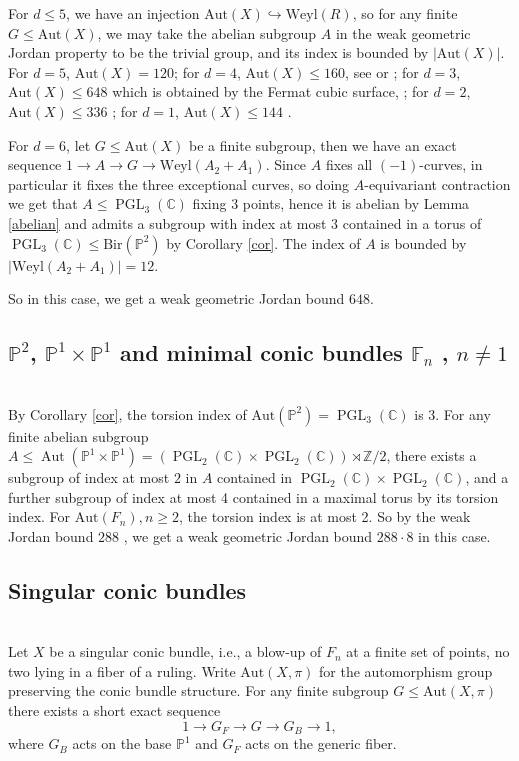 \documentclass[a4paper,12pt,oneside]{amsart}
\numberwithin{equation}{section}
\theoremstyle{definition}
\theoremstyle{remark}
\newcommand{\PP}{\mathbb{P}}
\newcommand{\Aut}{\mathrm{Aut}}
\begin{document}
For $d \leq 5$, we have an injection $\mathrm{Aut}(X) \hookrightarrow \mathrm{Weyl}(R)$, so for any finite $G\leqslant \mathrm{Aut}(X)$, we may take the abelian subgroup $A$ in the weak geometric Jordan property to be the trivial group, and its index is bounded by $|\mathrm{Aut}(X)|$. For $d=5$, $\mathrm{Aut}(X)=120$; for $d=4$, $\mathrm{Aut}(X)\leq 160$, see \cite[Theorem 1.1]{Hosoh1996} or \cite[Theorem 8.6.6]{Dolgachev2012}; for $d=3$, $\mathrm{Aut}(X)\leq 648$ which is obtained by the Fermat cubic surface, \cite[Theorem 9.5.6]{Dolgachev2012}; for $d=2$, $\mathrm{Aut}(X)\leq 336$ \cite[Section 8.7.3]{Dolgachev2012}; for $d=1$, $\mathrm{Aut}(X)\leq 144$ \cite[Section 8.8.4]{Dolgachev2012}.  

For $d = 6$, let $G\leqslant \Aut(X)$ be a finite subgroup, then we have an exact sequence $1 \to A \to G \to \mathrm{Weyl}(A_2 + A_1)$. Since $A$ fixes all $(-1)$-curves, in particular it fixes the three exceptional curves, so doing $A$-equivariant contraction we get that $A \leqslant \operatorname{PGL}_3(\mathbb{C})$ fixing $3$ points, hence it is abelian by Lemma \ref{abelian} and admits a subgroup with index at most $3$ contained in a torus of $\operatorname{PGL}_3(\mathbb{C}) \leqslant \mathrm{Bir}(\mathbb P^2)$ by Corollary \ref{cor}. The index of $A$ is bounded by $|\mathrm{Weyl}(A_2 + A_1)| = 12$.

So in this case, we get a weak geometric Jordan bound $648$.

\subsection{$\mathbb{P}^2$, $\PP^1\times \PP^1$ and minimal conic bundles $\mathbb{F}_n$ , $n\neq 1$}\mbox{}\\
By Corollary \ref{cor}, the torsion index of $\Aut(\PP^2) = \operatorname{PGL}_3(\mathbb{C})$ is 3. For any finite abelian subgroup $A \leqslant \operatorname{Aut}(\mathbb{P}^1 \times \mathbb{P}^1)=(\operatorname{PGL}_2(\mathbb C) \times \operatorname{PGL}_2(\mathbb C))\rtimes \mathbb{Z}/2$, there exists a subgroup of index at most $2$ in $A$ contained in $\operatorname{PGL}_2(\mathbb{C}) \times \operatorname{PGL}_2(\mathbb{C})$, and a further subgroup of index at most 4 contained in a maximal torus by its torsion index. For $\mathrm{Aut}(F_n),n\geq 2$, the torsion index is at most 2. So by the weak Jordan bound $288$ \cite[Proposition 1.2.3]{prok17}, we get a weak geometric Jordan bound $288\cdot 8$ in this case.

\subsection{Singular conic bundles}\mbox{}\\
Let $X$ be a singular conic bundle, i.e., a blow-up of $F_n$ at a finite set of points, no two lying in a fiber of a ruling. Write \(\mathrm{Aut}(X,\pi)\) for the automorphism group preserving the conic bundle structure. 
For any finite subgroup \(G \leqslant \mathrm{Aut}(X,\pi)\) there exists a short exact sequence
\[
1 \rightarrow G_F \rightarrow G \rightarrow G_B \rightarrow 1,
\]
where \(G_B\) acts on the base $\PP^1$ and \(G_F\) acts on the generic fiber. 
\end{document}
